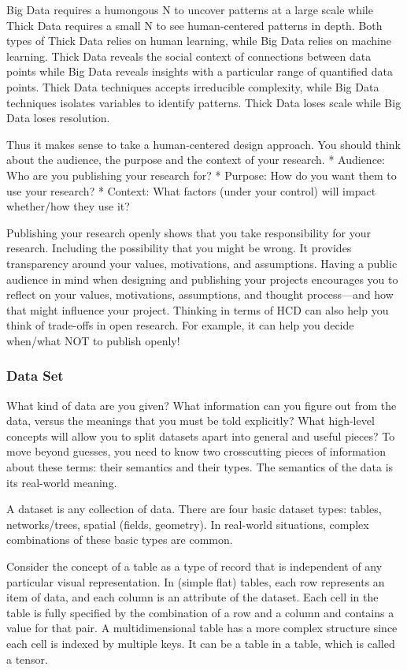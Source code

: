 \documentclass[
]{book}
\begin{document}
Big Data requires a humongous N to uncover patterns at a large scale while Thick Data requires a small N to see human-centered patterns in depth. Both types of Thick Data relies on human learning, while Big Data relies on machine learning. Thick Data reveals the social context of connections between data points while Big Data reveals insights with a particular range of quantified data points. Thick Data techniques accepts irreducible complexity, while Big Data techniques isolates variables to identify patterns. Thick Data loses scale while Big Data loses resolution.

Thus it makes sense to take a human-centered design approach. You should think about the audience, the purpose and the context of your research.
* Audience: Who are you publishing your research for?
* Purpose: How do you want them to use your research?
* Context: What factors (under your control) will impact whether/how they use it?

Publishing your research openly shows that you take responsibility for your research. Including the possibility that you might be wrong. It provides transparency around your values, motivations, and assumptions. Having a public audience in mind when designing and publishing your projects encourages you to reflect on your values, motivations, assumptions, and thought process---and how that might influence your project. Thinking in terms of HCD can also help you think of trade-offs in open research. For example, it can help you decide when/what NOT to publish openly!

\hypertarget{data-set}{%
\subsubsection{Data Set}\label{data-set}}

What kind of data are you given? What information can you figure out from the data, versus the meanings that you must be told explicitly? What high-level concepts will allow you to split datasets apart into general and useful pieces? To move beyond guesses, you need to know two crosscutting pieces of information about these terms: their semantics and their types. The semantics of the data is its real-world meaning.

A dataset is any collection of data. There are four basic dataset types: tables, networks/trees, spatial (fields, geometry). In real-world situations, complex combinations of these basic types are common.

Consider the concept of a table as a type of record that is independent of any particular visual representation. In (simple flat) tables, each row represents an item of data, and each column is an attribute of the dataset. Each cell in the table is fully specified by the combination of a row and a column and contains a value for that pair. A multidimensional table has a more complex structure since each cell is indexed by multiple keys. It can be a table in a table, which is called a tensor.
\end{document}
